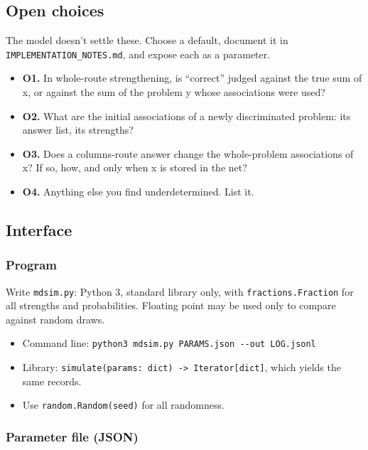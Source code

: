\subsection{Open choices}\label{open-choices}

The model doesn't settle these. Choose a default, document it in \texttt{IMPLEMENTATION\_NOTES.md}, and expose each as a parameter.

\begin{itemize}
\tightlist
\item
  \textbf{O1.} In whole-route strengthening, is ``correct'' judged against the true sum of x, or against the sum of the problem y whose associations were used?
\item
  \textbf{O2.} What are the initial associations of a newly discriminated problem: its answer list, its strengths?
\item
  \textbf{O3.} Does a columns-route answer change the whole-problem associations of x? If so, how, and only when x is stored in the net?
\item
  \textbf{O4.} Anything else you find underdetermined. List it.
\end{itemize}

\subsection{Interface}\label{interface}

\subsubsection{Program}\label{program}

Write \texttt{mdsim.py}: Python 3, standard library only, with \texttt{fractions.Fraction} for all strengths and probabilities. Floating point may be used only to compare against random draws.

\begin{itemize}
\tightlist
\item
  Command line: \texttt{python3\ mdsim.py\ PARAMS.json\ -\/-out\ LOG.jsonl}
\item
  Library: \texttt{simulate(params:\ dict)\ -\textgreater{}\ Iterator{[}dict{]}}, which yields the same records.
\item
  Use \texttt{random.Random(seed)} for all randomness.
\end{itemize}

\subsubsection{Parameter file (JSON)}\label{parameter-file-json}

